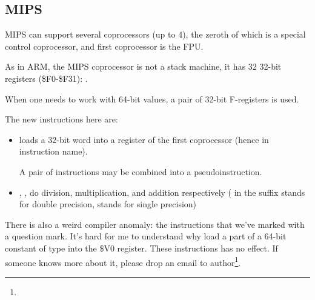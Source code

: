 \subsection{MIPS}

MIPS can support several coprocessors (up to 4), 
the zeroth of which is a special control coprocessor,
and first coprocessor is the FPU.

As in ARM, the MIPS coprocessor is not a stack machine, it has 32 32-bit registers (\$F0-\$F31):
.

When one needs to work with 64-bit \Tdouble values, a pair of 32-bit F-registers is used.



The new instructions here are:

\begin{itemize}

\item {} loads a 32-bit word into a register of the first coprocessor (hence  in instruction name).

A pair of  instructions may be combined into a  pseudoinstruction.

\item {}, ,  do division, multiplication, and addition respectively 
( in the suffix stands for double precision,  stands for single precision)

\end{itemize}

\myindex{\CompilerAnomaly}
\label{MIPS_FPU_LUI}

There is also a weird compiler anomaly: the  instructions that we've marked with a question mark.
It's hard for me to understand why load a part of a 64-bit constant of \Tdouble type into the \$V0 register.
These instructions has no effect.
If someone knows more about it, please drop an email to author\footnote{\EMAIL}.


